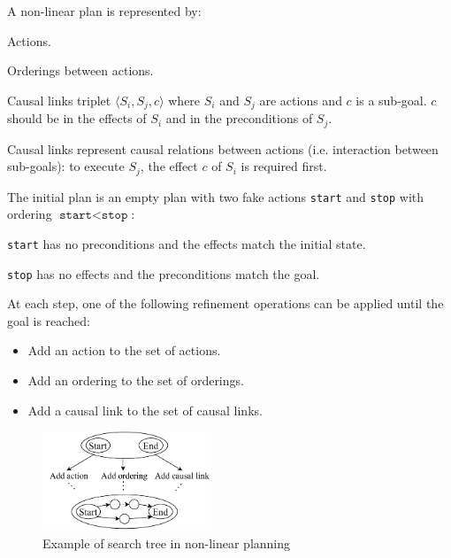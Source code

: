 A non-linear plan is represented by:
\begin{descriptionlist}
    \item[Actions{\normalfont.}] 
    \item[Orderings] 
        between actions.
    \item[Causal links] 
        triplet $\langle S_i, S_j, c \rangle$ where $S_i$ and $S_j$ are actions and $c$ is a sub-goal.
        $c$ should be in the effects of $S_i$ and in the preconditions of $S_j$.

        Causal links represent causal relations between actions (i.e. interaction between sub-goals): 
        to execute $S_j$, the effect $c$ of $S_i$ is required first.
\end{descriptionlist}

The initial plan is an empty plan with two fake actions \texttt{start} and \texttt{stop} 
with ordering $\texttt{start} < \texttt{stop}$:
\begin{descriptionlist}
    \item[\texttt{start}] has no preconditions and the effects match the initial state.
    \item[\texttt{stop}] has no effects and the preconditions match the goal.
\end{descriptionlist}
At each step, one of the following refinement operations can be applied until the goal is reached:
\begin{itemize}
    \item Add an action to the set of actions.
    \item Add an ordering to the set of orderings.
    \item Add a causal link to the set of causal links.
\end{itemize}

\begin{figure}[H]
    \centering
    \includegraphics[width=0.45\textwidth]{img/_nonlinear_plan_example.pdf}
    \caption{Example of search tree in non-linear planning}
\end{figure}



